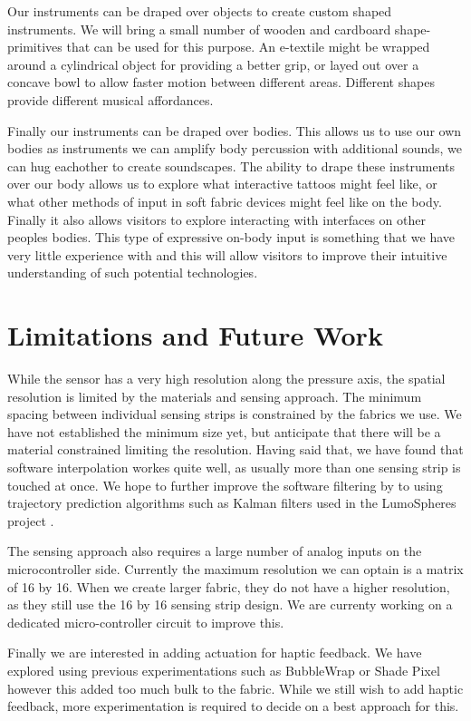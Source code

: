 \documentclass{sigchi-ext}
\begin{document}
Our instruments can be draped over objects to create custom shaped instruments. We will bring a small number of wooden and cardboard shape-primitives that can be used for this purpose. An e-textile might be wrapped around a cylindrical object for providing a better grip, or layed out over a concave bowl to allow faster motion between different areas. Different shapes provide different musical affordances.

Finally our instruments can be draped over bodies. This allows us to use our own bodies as instruments we can amplify body percussion with additional sounds, we can hug eachother to create soundscapes. The ability to drape these instruments over our body allows us to explore what interactive tattoos might feel like, or what other methods of input in soft fabric devices might feel like on the body. Finally it also allows visitors to explore interacting with interfaces on other peoples bodies. This type of expressive on-body input is something that we have very little experience with and this will allow visitors to improve their intuitive understanding of such potential technologies.



\section{Limitations and Future Work}
While the sensor has a very high resolution along the pressure axis, the spatial resolution is limited by the materials and sensing approach. The minimum spacing between individual sensing strips is constrained by the fabrics we use. We have not established the minimum size yet, but anticipate that there will be a material constrained limiting the resolution. Having said that, we have found that software interpolation workes quite well, as usually more than one sensing strip is touched at once. We hope to further improve the software filtering by to using trajectory prediction algorithms such as Kalman filters used in the LumoSpheres project \cite{lumospheres}.

The sensing approach also requires a large number of analog inputs on the microcontroller side. Currently the maximum resolution we can optain is a matrix of 16 by 16. When we create larger fabric, they do not have a higher resolution, as they still use the 16 by 16 sensing strip design. We are currenty working on a dedicated micro-controller circuit to improve this.

Finally we are interested in adding actuation for haptic feedback. We have explored using previous experimentations such as BubbleWrap \cite{bubblewrap} or Shade Pixel \cite{shadepixel} however this added too much bulk to the fabric. While we still wish to add haptic feedback, more experimentation is required to decide on a best approach for this.
\end{document}

